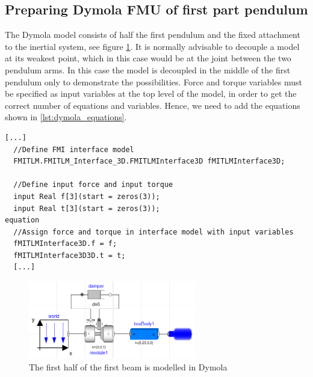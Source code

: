 \documentclass[a4paper,12pt]{include/opencpsreport}
\begin{document}
\subsection{Preparing Dymola FMU of first part pendulum}

The Dymola model consists of half the first pendulum and the fixed attachment to the inertial system, see figure \cref{fig:model_dymola}.
It is normally advisable to decouple a model at its weakest point, which in this case would be at the joint between the two pendulum arms.
In this case the model is decoupled in the middle of the first pendulum only to demonstrate the possibilities.
Force and torque variables must be specified as input variables at the top level of the model, in order to get the correct number of equations and variables.
Hence, we need to add the equations shown in \cref{lst:dymola_equations}.

\begin{lstlisting}[float, language=Modelica,basicstyle=\small\ttfamily, floatplacement=ht,label=lst:dymola_equations,caption=Input variables must be specified on top level in the Modelica models]
  [...]
  //Define FMI interface model
  FMITLM.FMITLM_Interface_3D.FMITLMInterface3D fMITLMInterface3D;
  
  //Define input force and input torque
  input Real f[3](start = zeros(3));
  input Real t[3](start = zeros(3));
equation
  //Assign force and torque in interface model with input variables
  fMITLMInterface3D.f = f;
  fMITLMInterface3D3D.t = t;
  [...]
\end{lstlisting}

\begin{figure}[ht]
\centering
\includegraphics[width=0.65\textwidth]{gfx/model_dymola.png}
\caption{The first half of the first beam is modelled in Dymola}
\label{fig:model_dymola}
\end{figure}
\end{document}
